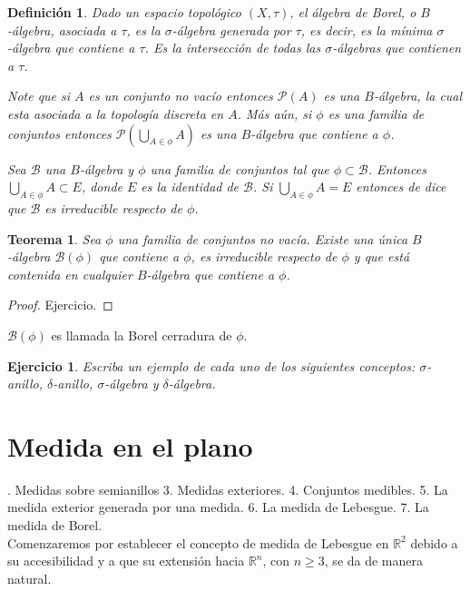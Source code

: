 \documentclass[twoside,12pt,a4 paper,openright]{book}
\newtheorem{teo}[claim]{Teorema}
\newtheorem{ejer}[claim]{Ejercicio}
\newtheorem{defi}[claim]{Definici\'on}
\begin{document}
\begin{defi}
Dado un espacio topol\'ogico $(X, \tau)$, el \'algebra de  Borel, o $B$-\'algebra,  asociada a $\tau$,   es la $\sigma$-\'algebra generada por $\tau$, es decir, es la m\'inima $\sigma$-\'algebra que contiene a $\tau$.  Es   la intersecci\'on de todas las $\sigma$-\'algebras que contienen a $\tau$.

 Note que si $A$ es un conjunto no vac\'io entonces $\mathcal P(A)$ es una $B$-\'algebra, la cual esta asociada a la topolog\'ia discreta en $A$. M\'as a\'un, si $\phi$ es una familia de conjuntos entonces 
 $\displaystyle \mathcal P( \bigcup_{A\in \phi} A)$ es una $B$-\'algebra que contiene a $\phi$.
 
 
Sea $\mathcal B$ una $B$-\'algebra y $\phi$ una familia de conjuntos tal que $\phi\subset \mathcal B$. Entonces $\bigcup_{A\in \phi} A \subset E$, donde $E$ es la identidad de $\mathcal B$. Si $\bigcup_{A\in \phi} A = E$ entonces de dice que $\mathcal B$ es irreducible respecto de $\phi$.
\end{defi}


\begin{teo}
Sea $\phi$    una familia  de conjuntos no vac\'ia. Existe una \'unica 
$B$-\'algebra $\mathcal B(\phi)$ que contiene a $\phi $, es irreducible respecto de $\phi$ y que est\'a contenida en cualquier $B$-\'algebra que contiene a  $\phi$. 
\end{teo}
\begin{proof}
Ejercicio.
\end{proof}

$\mathcal B(\phi)$ es llamada la Borel cerradura de $\phi$.

\begin{ejer}
Escriba un ejemplo de cada uno de los siguientes conceptos:  $\sigma$-anillo,   $\delta$-anillo,   $\sigma$-\'algebra y $\delta$-\'algebra.  
\end{ejer}


\section{Medida en el plano}


. Medidas sobre semianillos
3. Medidas exteriores.
4. Conjuntos medibles.
5. La medida exterior generada por una medida.
6. La medida de Lebesgue.
7. La medida de Borel.
\\

\noindent
Comenzaremos por establecer el concepto de medida de Lebesgue en $\mathbb R^2$ debido a su accesibilidad y a que su extensi\'on hacia   $\mathbb R^n$, con $n\geq 3$, se da de manera  natural.
\end{document}

